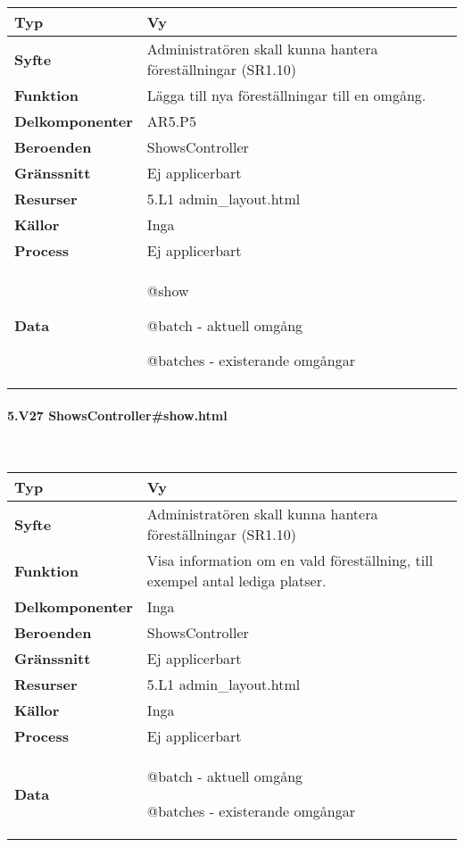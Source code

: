 \documentclass[a4paper, twoside, 11pt, titlepage]{article}
\begin{document}
			\begin {table} [ht] \begin{tabular} {  p{3.5cm} p{11.6cm} }
				\hline
				{\sffamily\textbf{Typ}} & {Vy} \\
				\hline
				{\sffamily\textbf{Syfte}} & {Administratören skall kunna hantera föreställningar (SR1.10)} \\
				\hline
				{\sffamily\textbf{Funktion}} & {Lägga till nya föreställningar till en omgång.} \\
				\hline
				{\sffamily\textbf{Delkomponenter}} & {AR5.P5} \\
				\hline
				{\sffamily\textbf{Beroenden}} & {ShowsController} \\
				\hline
				{\sffamily\textbf{Gränssnitt}} & {Ej applicerbart} \\
				\hline
				{\sffamily\textbf{Resurser}} & {5.L1 admin\_layout.html} \\
				\hline
				{\sffamily\textbf{Källor}} & {Inga} \\
				\hline
				{\sffamily\textbf{Process}} & {Ej applicerbart} \\
				\hline
				{\sffamily\textbf{Data}} & {@show

@batch - aktuell omgång

@batches - existerande omgångar} \\
				\hline
			\end{tabular} \end{table} \FloatBarrier


			\clearpage %
			\paragraph{5.V27 ShowsController\#show.html}\

			\begin {table} [ht] \begin{tabular} {  p{3.5cm} p{11.6cm} }
				\hline
				{\sffamily\textbf{Typ}} & {Vy} \\
				\hline
				{\sffamily\textbf{Syfte}} & {Administratören skall kunna hantera föreställningar (SR1.10)} \\
				\hline
				{\sffamily\textbf{Funktion}} & {Visa information om en vald föreställning, till exempel antal lediga platser.} \\
				\hline
				{\sffamily\textbf{Delkomponenter}} & {Inga} \\
				\hline
				{\sffamily\textbf{Beroenden}} & {ShowsController} \\
				\hline
				{\sffamily\textbf{Gränssnitt}} & {Ej applicerbart} \\
				\hline
				{\sffamily\textbf{Resurser}} & {5.L1 admin\_layout.html} \\
				\hline
				{\sffamily\textbf{Källor}} & {Inga} \\
				\hline
				{\sffamily\textbf{Process}} & {Ej applicerbart} \\
				\hline
				{\sffamily\textbf{Data}} & {@batch - aktuell omgång

@batches - existerande omgångar} \\
				\hline
			\end{tabular} \end{table} \FloatBarrier
\end{document}
